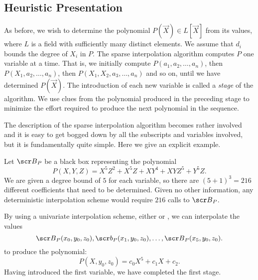 \subsection{Heuristic Presentation}

As before, we wish to determine the polynomial $P(\vec X) \in L[\vec X]$
from its values, where $L$ is a field with sufficiently many distinct
elements.  We assume that $d_i$ bounds the degree of $X_i$ in $P$.  The
sparse interpolation algorithm computes $P$ one variable at a time.  That
is, we initially compute $P(a_1, a_2, \ldots, a_n)$, then $P(X_1, a_2,
\ldots,a_n)$, then $P(X_1, X_2, a_3, \ldots, a_n)$ and so on, until we have
determined $P(\vec X)$.  The introduction of each new variable is called a
{\em stage} of the algorithm.  We use clues from the polynomial produced in
the preceding stage to minimize the effort required to produce the next
polynomial in the sequence.

The description of the sparse interpolation algorithm becomes rather
involved and it is easy to get bogged down by all the subscripts and
variables involved, but it is fundamentally quite simple.  Here we
give an explicit example.

Let ${\scr B}_P$ be a black box representing the polynomial
\[
P(X, Y, Z) = 
  X^5 Z^2 + X^5 Z + X Y^4 + X Y Z^5 + Y^5 Z.
\]
We are given a degree bound of $5$ for each variable, so there are
$(5+1)^3 = 216$ different coefficients that need to be determined.
Given no other information, any deterministic interpolation scheme
would require $216$ calls to ${\scr B}_P$.  

By using a univariate interpolation scheme, either
 or , we can
interpolate the values
\[
{\scr B}_P(x_0, y_0, z_0), {\scr b}_P(x_1, y_0, z_0), \ldots, 
{\scr B}_P(x_5, y_0, z_0).
\]
to produce the polynomial:
\[
P(X, y_0, z_0) = c_0 X^5 + c_1 X + c_2.
\]
Having introduced the first variable, we have completed the first
stage.

